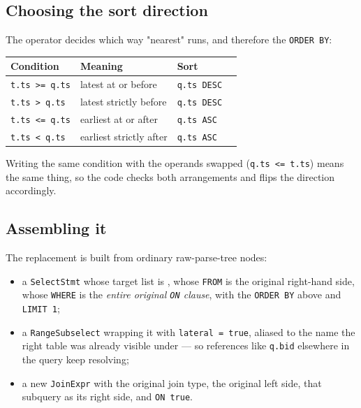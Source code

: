\documentclass[11pt,a4paper]{article}
\newcommand{\code}[1]{\texttt{\small #1}}
\begin{document}
\subsection*{Choosing the sort direction}

The operator decides which way "nearest" runs, and therefore the \code{ORDER BY}:

\begin{center}
\begin{tabular}{@{}llll@{}}
\toprule
\textbf{Condition} & \textbf{Meaning} & \textbf{Sort} \\
\midrule
\code{t.ts >= q.ts} & latest at or before   & \code{q.ts DESC} \\
\code{t.ts > q.ts}  & latest strictly before & \code{q.ts DESC} \\
\code{t.ts <= q.ts} & earliest at or after  & \code{q.ts ASC} \\
\code{t.ts < q.ts}  & earliest strictly after & \code{q.ts ASC} \\
\bottomrule
\end{tabular}
\end{center}

Writing the same condition with the operands swapped (\code{q.ts <= t.ts}) means the same
thing, so the code checks both arrangements and flips the direction accordingly.

\subsection*{Assembling it}

The replacement is built from ordinary raw-parse-tree nodes:

\begin{itemize}[nosep,leftmargin=*]
\item a \code{SelectStmt} whose target list is \code{*}, whose \code{FROM} is the original
      right-hand side, whose \code{WHERE} is the \emph{entire original \code{ON} clause},
      with the \code{ORDER BY} above and \code{LIMIT 1};
\item a \code{RangeSubselect} wrapping it with \code{lateral = true}, aliased to the name
      the right table was already visible under — so references like \code{q.bid} elsewhere
      in the query keep resolving;
\item a new \code{JoinExpr} with the original join type, the original left side, that
      subquery as its right side, and \code{ON true}.
\end{itemize}
\end{document}
